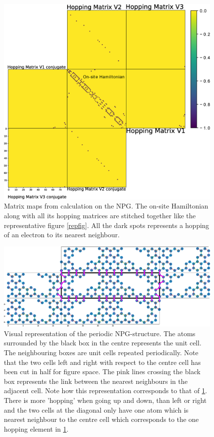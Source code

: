 \begin{figure}[H]
    \centering
    \includegraphics[width=\textwidth]{Figures/name/Matrixmap.eps}
    \caption{Matrix maps from calculation on the NPG. The on-site Hamiltonian along with all its hopping matrices are stitched together like the representative figure \cref{repfig}. All the dark spots represents a hopping of an electron to its nearest neighbour.}
    \label{matrixmap}
\end{figure}
\begin{figure}[H]
    \centering
    \includegraphics[width=\textwidth]{Figures/name/representativestructure2.eps}
    \caption{Visual representation of the periodic NPG-structure. The atoms surrounded by the black box in the centre represents the unit cell. The neighbouring boxes are unit cells repeated periodically. Note that the two cells left and right with respect to the centre cell has been cut in half for figure space. The pink lines crossing the black box represents the link between the nearest neighbours in the adjacent cell. Note how this representation corresponds to that of \cref{matrixmap}. There is more 'hopping' when going up and down, than left or right and the two cells at the diagonal only have one atom which is nearest neighbour to the centre cell which corresponds to the one hopping element in \cref{matrixmap}.}
    \label{atomrepfig}
\end{figure}
